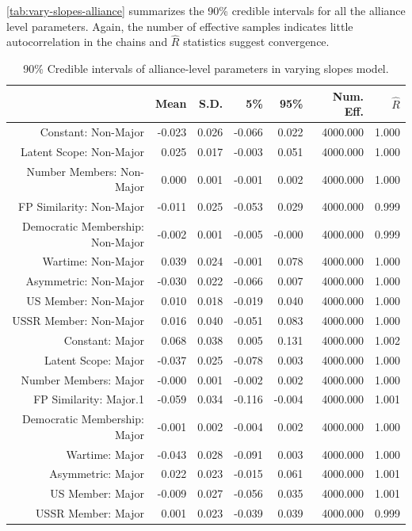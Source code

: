 \documentclass[12pt]{article}
\begin{document}
\autoref{tab:vary-slopes-alliance} summarizes the 90\% credible intervals for all the alliance level parameters. 
Again, the number of effective samples indicates little autocorrelation in the chains and $\hat{R}$ statistics suggest convergence. 


\begin{table}[ht]
\centering
\begin{tabular}{rrrrrrr}
  \hline
 & Mean & S.D. & 5\% & 95\% & Num. Eff. & $\hat{R}$ \\ 
  \hline
  Constant: Non-Major & -0.023 & 0.026 & -0.066 & 0.022 & 4000.000 & 1.000 \\ 
  Latent Scope: Non-Major & 0.025 & 0.017 & -0.003 & 0.051 & 4000.000 & 1.000 \\ 
  Number Members: Non-Major & 0.000 & 0.001 & -0.001 & 0.002 & 4000.000 & 1.000 \\ 
  FP Similarity: Non-Major & -0.011 & 0.025 & -0.053 & 0.029 & 4000.000 & 0.999 \\ 
  Democratic Membership: Non-Major & -0.002 & 0.001 & -0.005 & -0.000 & 4000.000 & 0.999 \\ 
  Wartime: Non-Major & 0.039 & 0.024 & -0.001 & 0.078 & 4000.000 & 1.000 \\ 
  Asymmetric: Non-Major & -0.030 & 0.022 & -0.066 & 0.007 & 4000.000 & 1.000 \\ 
  US Member: Non-Major & 0.010 & 0.018 & -0.019 & 0.040 & 4000.000 & 1.000 \\ 
  USSR Member: Non-Major & 0.016 & 0.040 & -0.051 & 0.083 & 4000.000 & 1.000 \\ 
  Constant: Major & 0.068 & 0.038 & 0.005 & 0.131 & 4000.000 & 1.002 \\ 
  Latent Scope: Major & -0.037 & 0.025 & -0.078 & 0.003 & 4000.000 & 1.000 \\ 
  Number Members: Major & -0.000 & 0.001 & -0.002 & 0.002 & 4000.000 & 1.000 \\ 
  FP Similarity: Major.1 & -0.059 & 0.034 & -0.116 & -0.004 & 4000.000 & 1.001 \\ 
  Democratic Membership: Major & -0.001 & 0.002 & -0.004 & 0.002 & 4000.000 & 1.000 \\ 
  Wartime: Major & -0.043 & 0.028 & -0.091 & 0.003 & 4000.000 & 1.000 \\ 
  Asymmetric: Major & 0.022 & 0.023 & -0.015 & 0.061 & 4000.000 & 1.001 \\ 
  US Member: Major & -0.009 & 0.027 & -0.056 & 0.035 & 4000.000 & 1.001 \\ 
  USSR Member: Major & 0.001 & 0.023 & -0.039 & 0.039 & 4000.000 & 0.999 \\ 
   \hline
\end{tabular}
\caption{90\% Credible intervals of alliance-level parameters in varying slopes model.}
\label{tab:vary-slopes-alliance}
\end{table}

  
 
\end{document}
